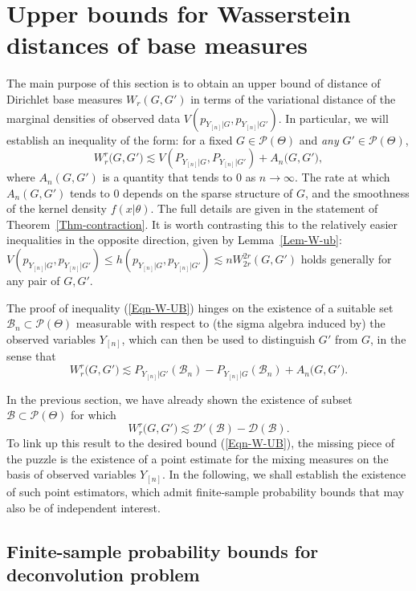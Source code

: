 \documentclass[MSNbibl,number,citesort]{arxbj}
\newcommand{\eqref}[1]{(\ref{#1})}
\newcommand{\Dcal}{\mathcal{D}}
\newcommand{\Pcal}{\mathscr{P}}
\newcommand{\BB}{\mathscr{B}}
\newcommand{\W}{W}
\newcommand{\Wr}{W_r}
\newcommand{\PG}{P_{Y_{[n]}|G}}
\begin{document}
\section{Upper bounds for Wasserstein distances of base measures}
\label{Sec-contraction}
The main purpose of this section is to obtain an upper bound of
distance of
Dirichlet base measures $\Wr(G,G')$ in terms of the variational
distance of the
marginal densities of observed data $V(
{p_{Y_{[n]}|G}},{p_{Y_{[n]}|G'}})$. In particular, we will
establish an inequality of the form: for a fixed $G\in\Pcal(\Theta)$ and
\emph{any} $G' \in\Pcal(\Theta)$,
%
%
\begin{equation}
\label{Eqn-W-UB} \Wr^r \bigl(G,G' \bigr) \lesssim V(\PG,
P_{Y_{[n]}|G'}) + A_n \bigl(G,G' \bigr),
\end{equation}
%
where $A_n(G,G')$ is a quantity that tends to 0 as $n \rightarrow
\infty$.
The rate at which $A_n(G,G')$ tends to 0 depends on the sparse
structure of
$G$, and the smoothness of the kernel density $f(x|\theta)$.
The full details are given in the statement of Theorem~\ref{Thm-contraction}.
It is worth contrasting this to the relatively easier
inequalities in the opposite direction,
given by Lemma~\ref{Lem-W-ub}: $V(
{p_{Y_{[n]}|G}},{p_{Y_{[n]}|G'}}) \leq h(
{p_{Y_{[n]}|G}},{p_{Y_{[n]}|G'}})
\lesssim n\W_{2r}^{2r}(G,G')$ holds generally for any pair of $G,G'$.

The proof of inequality \eqref{Eqn-W-UB} hinges on the existence of
a suitable set $\BB_n \subset\Pcal(\Theta)$ measurable with respect to
(the sigma algebra induced by) the observed variables $Y_{[n]}$,
which can then be used to distinguish $G'$ from $G$, in the sense that
%
\[
\Wr^r \bigl(G,G' \bigr) \lesssim P_{Y_{[n]}|G'}(
\BB_n) - \PG(\BB_n) + A_n
\bigl(G,G' \bigr).
\]

In the previous section,
we have already shown the existence of subset $\BB\subset\Pcal
(\Theta
)$ for which
%
\[
\Wr^r \bigl(G,G' \bigr) \lesssim\Dcal'(
\BB) - \Dcal(\BB).
\]
%
To link up this result to the desired bound \eqref{Eqn-W-UB}, the missing
piece of the puzzle is the existence of a point estimate for the mixing measures
on the basis of observed variables $Y_{[n]}$.
In the following, we shall establish the existence of such point estimators,
which admit finite-sample probability bounds that
may also be of independent interest.

\subsection{Finite-sample probability bounds for deconvolution problem}
\end{document}
